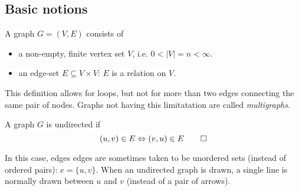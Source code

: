 








\subsection{Basic notions}
\begin{definition}[Graph]\label{def:graph}
A graph \(G=(V,E)\) consists of
\begin{itemize}
  \item a non-empty, finite vertex set \(V\), i.e. \(0 < |V| = n < \infty\).
  \item an edge-set \(E\subseteq V\times V\): \(E\) is a relation on \(V\). \qedhere
\end{itemize}
\end{definition}
This definition allows for loops, but not for more than two edges connecting the same pair of nodes. 
Graphs not having this limitatation are called \emph{multigraphs}.
\begin{definition}\label{def:undirected-graph}
A graph \(G\) is undirected if
\[
(u,v) \in E \Leftrightarrow (v,u) \in E \qedhere
\]
\end{definition}
In this case, edges edges are sometimes taken to be unordered sets (instead of ordered pairs): \(e=\{u,v\}\).
When an undirected graph is drawn, a single line is normally drawn between \(u\) and \(v\) (instead of a pair of arrows).

